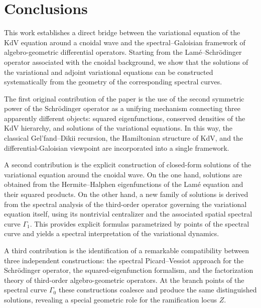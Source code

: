 \documentclass[a4paper,12pt]{article}
\begin{document}
\bigskip


\section{Conclusions}


This work establishes a direct bridge between the variational equation of the
KdV equation around a cnoidal wave and the spectral--Galoisian framework of
algebro-geometric differential operators. Starting from the Lam\'e--Schr\"odinger
operator associated with the cnoidal background, we show that the solutions of
the variational and adjoint variational equations can be constructed
systematically from the geometry of the corresponding spectral curves.

The first original contribution of the paper is the use of the second
symmetric power of the Schr\"odinger operator as a unifying mechanism
connecting three apparently different objects: squared eigenfunctions,
conserved densities of the KdV hierarchy, and solutions of the variational
equations. In this way, the classical Gel'fand--Dikii recursion, the
Hamiltonian structure of KdV, and the differential-Galoisian viewpoint are
incorporated into a single framework.

A second contribution is the explicit construction of closed-form solutions
of the variational equation around the cnoidal wave. On the one hand,
solutions are obtained from the Hermite--Halphen eigenfunctions of the Lam\'e
equation and their squared products. On the other hand, a new family of
solutions is derived from the spectral analysis of the third-order operator
governing the variational equation itself, using its nontrivial centralizer
and the associated spatial spectral curve $\Gamma_1$. This provides explicit
formulas parametrized by points of the spectral curve and yields a spectral
interpretation of the variational dynamics.

A third contribution is the identification of a remarkable compatibility
between three independent constructions: the spectral Picard--Vessiot
approach for the Schr\"odinger operator, the squared-eigenfunction formalism,
and the factorization theory of third-order algebro-geometric operators. At
the branch points of the spectral curve $\Gamma_0$ these constructions
coalesce and produce the same distinguished solutions, revealing a special
geometric role for the ramification locus $Z$.
\end{document}
